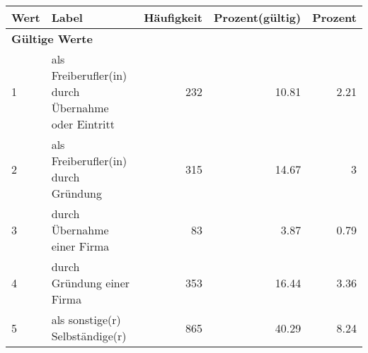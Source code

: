      \begin{longtable}{lXrrr}
     \toprule
     \textbf{Wert} & \textbf{Label} & \textbf{Häufigkeit} & \textbf{Prozent(gültig)} & \textbf{Prozent} \\
     \endhead
     \midrule
     \multicolumn{5}{l}{\textbf{Gültige Werte}}\\

     1 &
     \multicolumn{1}{X}{ als Freiberufler(in) durch Übernahme oder Eintritt   } &


       \num{232} &
       \num[round-mode=places,round-precision=2]{10.81} &
         \num[round-mode=places,round-precision=2]{2.21} \\

     2 &
     \multicolumn{1}{X}{ als Freiberufler(in) durch Gründung   } &


       \num{315} &
       \num[round-mode=places,round-precision=2]{14.67} &
         \num[round-mode=places,round-precision=2]{3} \\

     3 &
     \multicolumn{1}{X}{ durch Übernahme einer Firma   } &


       \num{83} &
       \num[round-mode=places,round-precision=2]{3.87} &
         \num[round-mode=places,round-precision=2]{0.79} \\

     4 &
     \multicolumn{1}{X}{ durch Gründung einer Firma   } &


       \num{353} &
       \num[round-mode=places,round-precision=2]{16.44} &
         \num[round-mode=places,round-precision=2]{3.36} \\

     5 &
     \multicolumn{1}{X}{ als sonstige(r) Selbständige(r)   } &


       \num{865} &
       \num[round-mode=places,round-precision=2]{40.29} &
         \num[round-mode=places,round-precision=2]{8.24} \\


\end{longtable}
